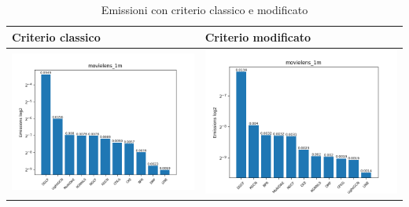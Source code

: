\begin{table}[H]
    \centering
    \footnotesize
    \setlength\tabcolsep{0pt}
    \begin{tabularx}{\textwidth}{|X|X|}
        \hline
        \textbf{Criterio classico} & \textbf{Criterio modificato} \\
        \hline
        \includegraphics[width=\linewidth, trim=0 0 0 0]{images/emissions_movielens_1m_40_7_earlyClassic.png} &
        \includegraphics[width=\linewidth, trim=0 0 0 0]{images/emissions_movielens_1m_40_7_earlyModified.png} \\
        \hline
    \end{tabularx}
    \caption{Emissioni con criterio classico e modificato}
    \label{tab:emissions_info}
\end{table}



